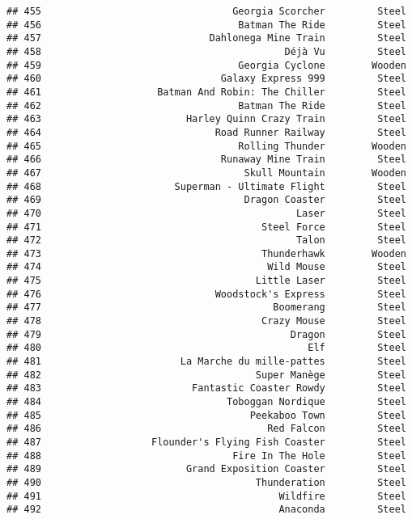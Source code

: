 \documentclass[
]{article}
\begin{document}
\begin{verbatim}
## 455                                 Georgia Scorcher         Steel
## 456                                  Batman The Ride         Steel
## 457                             Dahlonega Mine Train         Steel
## 458                                          Déjà Vu         Steel
## 459                                  Georgia Cyclone        Wooden
## 460                               Galaxy Express 999         Steel
## 461                    Batman And Robin: The Chiller         Steel
## 462                                  Batman The Ride         Steel
## 463                         Harley Quinn Crazy Train         Steel
## 464                              Road Runner Railway         Steel
## 465                                  Rolling Thunder        Wooden
## 466                               Runaway Mine Train         Steel
## 467                                   Skull Mountain        Wooden
## 468                       Superman - Ultimate Flight         Steel
## 469                                   Dragon Coaster         Steel
## 470                                            Laser         Steel
## 471                                      Steel Force         Steel
## 472                                            Talon         Steel
## 473                                      Thunderhawk        Wooden
## 474                                       Wild Mouse         Steel
## 475                                     Little Laser         Steel
## 476                              Woodstock's Express         Steel
## 477                                        Boomerang         Steel
## 478                                      Crazy Mouse         Steel
## 479                                           Dragon         Steel
## 480                                              Elf         Steel
## 481                        La Marche du mille-pattes         Steel
## 482                                     Super Manège         Steel
## 483                          Fantastic Coaster Rowdy         Steel
## 484                                Toboggan Nordique         Steel
## 485                                    Peekaboo Town         Steel
## 486                                       Red Falcon         Steel
## 487                   Flounder's Flying Fish Coaster         Steel
## 488                                 Fire In The Hole         Steel
## 489                         Grand Exposition Coaster         Steel
## 490                                     Thunderation         Steel
## 491                                         Wildfire         Steel
## 492                                         Anaconda         Steel

\end{verbatim}
\end{document}
